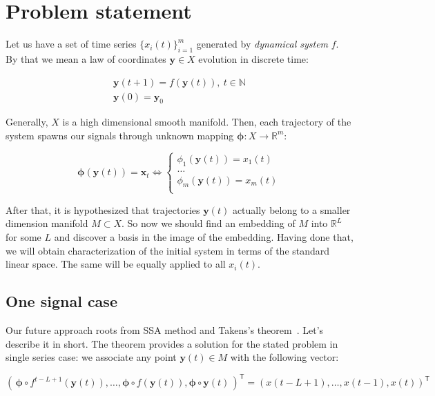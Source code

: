 \documentclass[referee, pdflatex, sn-mathphys-num]{sn-jnl}
\theoremstyle{definition}
\theoremstyle{plain}
\begin{document}
	\section{Problem statement}\label{sec:problem_statement}
	
	Let us have a set of time series $ \{x_i(t)\}_{i=1}^m $ generated by \emph{dynamical system} $ f $. By that we mean a law of coordinates $ \mathbf{y} \in X $ evolution in discrete time:
	
	\begin{gather*}
		\mathbf{y}(t + 1) = f(\mathbf{y}(t)), \ t \in \mathbb{N} \\
		\mathbf{y}(0) = \mathbf{y}_0
	\end{gather*}
	
	Generally, $ X $ is a high dimensional smooth manifold. Then, each trajectory of the system spawns our signals through unknown mapping $ \boldsymbol{\phi}: X \to \mathbb{R}^m $:
	
	\begin{equation*}
		\boldsymbol{\phi}(\mathbf{y}(t)) = \mathbf{x}_t \Leftrightarrow \begin{cases}
			\phi_1(\mathbf{y}(t)) = x_1(t) \\
			\ldots \\
			\phi_m(\mathbf{y}(t)) = x_m(t) \\
		\end{cases}
	\end{equation*}
	
	After that, it is hypothesized that trajectories $ \mathbf{y}(t) $ actually belong to a smaller dimension manifold $ M \subset X $. So now we should find an embedding of $ M $ into $ \mathbb{R}^{L} $ for some $ L $ and discover a basis in the image of the embedding. Having done that, we will obtain characterization of the initial system in terms of the standard linear space. The same will be equally applied to all $ x_i(t) $.
	
	\subsection{One signal case}
	
	Our future approach roots from SSA method and Takens's theorem~\cite{citeulike:2735031}. Let's describe it in short. The theorem provides a solution for the stated problem in single series case: we associate any point $ \mathbf{y}(t) \in M $ with the following vector:
	
	\[
	( \, \boldsymbol{\phi} \circ f^{t - L + 1}(\mathbf{y}(t)), \ldots , \boldsymbol{\phi} \circ f(\mathbf{y}(t)), \boldsymbol{\phi} \circ \mathbf{y}(t) \,)^{\mathsf{T}} = (x(t - L + 1), \ldots , x(t-1), x(t))^{\mathsf{T}}
	\] 
	
\end{document}
